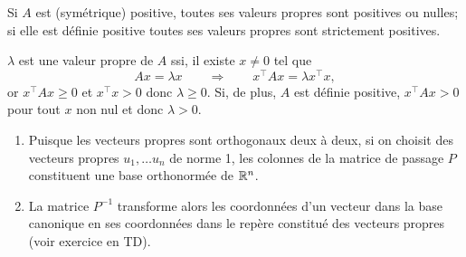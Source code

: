 \begin{proposition*}
  Si $A$ est (symétrique) positive, toutes ses valeurs propres sont positives ou nulles; si elle est définie positive toutes ses valeurs propres sont strictement positives.
\end{proposition*}

\proof
$\lambda$ est une valeur propre de $A$ ssi, il existe $x \neq 0$ tel que
$$
Ax = \lambda x \qquad \Rightarrow \qquad x^\top A x = \lambda x^\top x,
$$
or $x^\top A x \geq 0$ et $x^\top x > 0$ donc $\lambda \geq 0$. Si, de plus, $A$ est définie positive, $x^\top A x > 0$ pour tout $x$ non nul et donc $\lambda > 0$.
\eproof

% 

\remark
\begin{enumerate}
 \item Puisque les vecteurs propres sont orthogonaux deux à deux, si on choisit des vecteurs propres $u_1, \dots u_n$ de norme 1, les colonnes de la matrice de passage $P$ constituent une base orthonormée de $\mathbb{R}^n$. 
 \item La matrice $P^{-1}$ transforme alors les coordonnées d'un vecteur dans la base canonique en ses coordonnées dans le repère constitué des vecteurs propres (voir exercice en TD).
\end{enumerate}



